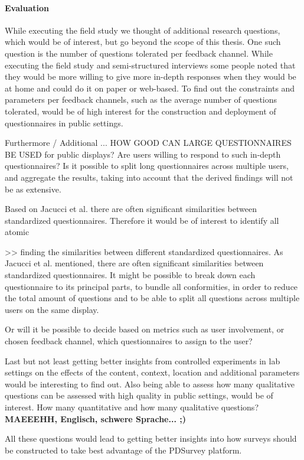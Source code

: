 \paragraph{Evaluation}

While executing the field study we thought of additional research questions, which would be of interest, but go beyond the scope of this thesis. %
One such question is the number of questions tolerated per feedback channel. While executing the field study and semi-structured interviews some people noted that they would be more willing to give more in-depth responses when they would be at home and could do it on paper or web-based. To find out the constraints and parameters per feedback channels, such as the average number of questions tolerated, would be of high interest for the construction and deployment of questionnaires in public settings.


Furthermore / Additional ... HOW GOOD CAN LARGE QUESTIONNAIRES BE USED for public displays? Are users willing to respond to such in-depth questionnaires? Is it possible to split long questionnaires across multiple users, and aggregate the results, taking into account that the derived findings will not be as extensive.

	Based on Jacucci et al. \cite{jacucci2010worldsofinformation} there are often significant similarities between standardized questionnaires. Therefore it would be of interest to identify all atomic 
	 
	 >> finding the similarities between different standardized questionnaires. As Jacucci et al. \cite{jacucci2010worldsofinformation} mentioned, there are often significant similarities between standardized questionnaires. It might be possible to break down each questionnaire to its principal parts, to bundle all conformities, in order to reduce the total amount of questions and to be able to split all questions across multiple users on the same display.

	Or will it be possible to decide based on metrics such as user involvement, or chosen feedback channel, which questionnaires to assign to the user?


Last but not least getting better insights from controlled experiments in lab settings on the effects of the content, context, location and additional parameters would be interesting to find out. Also being able to assess how many qualitative questions can be assessed with high quality in public settings, would be of interest. 
How many quantitative and how many qualitative questions?
 \textbf{MAEEEHH, Englisch, schwere Sprache... ;)}


All these questions would lead to getting better insights into how surveys should be constructed to take best advantage of the PDSurvey platform.


